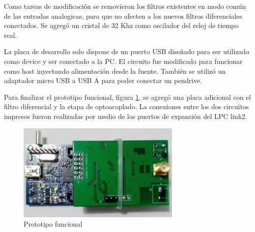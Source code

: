 \vspace{10mm}

Como tareas de modificación se removieron los filtros existentes en modo común de las entradas analogicas, para que no afecten a los nuevos filtros diferenciales conectados. Se agregó un cristal de 32 Khz como oscilador del reloj de tiempo real.

La placa de desarrollo solo dispone de un puerto USB diseñado para ser utilizado como device y ser conectado a la PC. El circuito fue modificado para funcionar como host inyectando alimentación desde la fuente. También se utilizó un adaptador micro USB a USB A para poder conectar un pendrive.  

Para finalizar el prototipo funcional, figura \ref{fig:hardProto}, se agregó una placa adicional con el filtro diferencial y la etapa de optoacoplado. La conexiones entre los dos circuitos impresos fueron realizadas por medio de los puertos de expansión del LPC link2. 

\begin{figure}[ht]
	\centering
	\includegraphics[width=80mm]{./Figures/hardProto.png}
	\caption{Prototipo funcional}
	\label{fig:hardProto}
\end{figure}